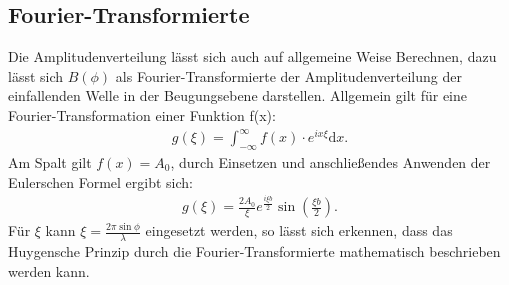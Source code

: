 \subsection{Fourier-Transformierte}
Die Amplitudenverteilung lässt sich auch auf allgemeine Weise Berechnen, dazu lässt sich $B(\phi)$ als
Fourier-Transformierte der Amplitudenverteilung der einfallenden Welle in der Beugungsebene darstellen.
Allgemein gilt für eine Fourier-Transformation einer Funktion f(x):
\begin{align}
g(\xi)= \int_{-\infty}^\infty f(x) \cdot e^{ix\xi} \mathrm{d}x.
\end{align}
Am Spalt gilt $f(x)=A_0$, durch  Einsetzen und anschließendes Anwenden der Eulerschen Formel ergibt sich:
\begin{align}
g(\xi)=\frac{2A_0}{\xi} e^{\frac{i\xi b}{2}}\sin\left(\frac{\xi b}{2}\right).
\end{align}
Für $\xi$ kann $\xi=\frac{2\pi\sin\phi}{\lambda}$ eingesetzt werden, so lässt sich erkennen, dass das Huygensche Prinzip
durch die Fourier-Transformierte mathematisch beschrieben werden kann.
